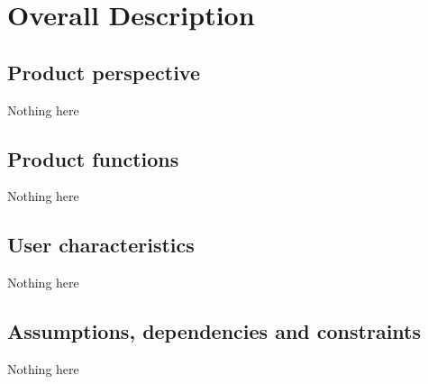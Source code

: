 \section{Overall Description}

\subsection{Product perspective}
Nothing here

\subsection{Product functions}
Nothing here

\subsection{User characteristics}
Nothing here

\subsection{Assumptions, dependencies and constraints}
Nothing here

